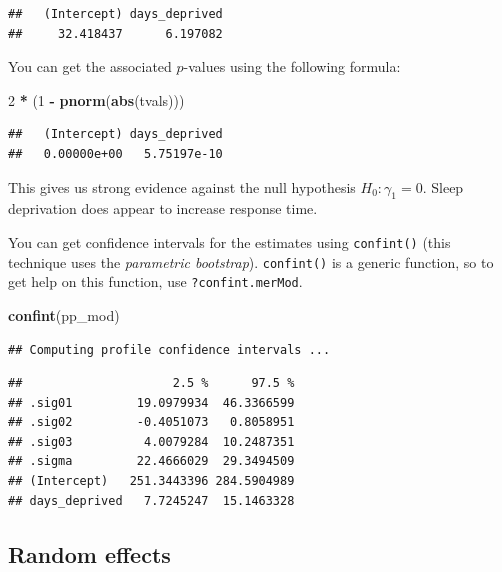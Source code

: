 \documentclass[]{book}
\newenvironment{Shaded}{\begin{snugshade}}{\end{snugshade}}
\newcommand{\DecValTok}[1]{\textcolor[rgb]{0.00,0.00,0.81}{#1}}
\newcommand{\KeywordTok}[1]{\textcolor[rgb]{0.13,0.29,0.53}{\textbf{#1}}}
\newcommand{\NormalTok}[1]{#1}
\newcommand{\OperatorTok}[1]{\textcolor[rgb]{0.81,0.36,0.00}{\textbf{#1}}}
\newcommand{\StringTok}[1]{\textcolor[rgb]{0.31,0.60,0.02}{#1}}
\begin{document}
\begin{verbatim}
##   (Intercept) days_deprived 
##     32.418437      6.197082
\end{verbatim}

You can get the associated \(p\)-values using the following formula:

\begin{Shaded}
\begin{Highlighting}[]
\DecValTok{2} \OperatorTok{*}\StringTok{ }\NormalTok{(}\DecValTok{1} \OperatorTok{-}\StringTok{ }\KeywordTok{pnorm}\NormalTok{(}\KeywordTok{abs}\NormalTok{(tvals)))}
\end{Highlighting}
\end{Shaded}

\begin{verbatim}
##   (Intercept) days_deprived 
##   0.00000e+00   5.75197e-10
\end{verbatim}

This gives us strong evidence against the null hypothesis \(H_0: \gamma_1 = 0\). Sleep deprivation does appear to increase response time.

You can get confidence intervals for the estimates using \texttt{confint()} (this technique uses the \emph{parametric bootstrap}). \texttt{confint()} is a generic function, so to get help on this function, use \texttt{?confint.merMod}.

\begin{Shaded}
\begin{Highlighting}[]
\KeywordTok{confint}\NormalTok{(pp_mod)}
\end{Highlighting}
\end{Shaded}

\begin{verbatim}
## Computing profile confidence intervals ...
\end{verbatim}

\begin{verbatim}
##                     2.5 %      97.5 %
## .sig01         19.0979934  46.3366599
## .sig02         -0.4051073   0.8058951
## .sig03          4.0079284  10.2487351
## .sigma         22.4666029  29.3494509
## (Intercept)   251.3443396 284.5904989
## days_deprived   7.7245247  15.1463328
\end{verbatim}

\hypertarget{random-effects}{%
\subsection{Random effects}\label{random-effects}}
\end{document}

